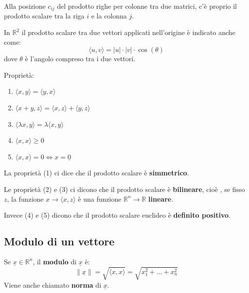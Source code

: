 \documentclass[
  a4paper,
]{article}
\providecommand{\tightlist}{%
  \setlength{\itemsep}{0pt}\setlength{\parskip}{0pt}}
\providecommand{\tightlist}{}
\begin{document}
\begin{observationbox}
Alla posizione \(c_{ij}\) del prodotto righe per colonne tra due
matrici, c'è proprio il prodotto scalare tra la riga \(i\) e la colonna
\(j\).
\end{observationbox}

\begin{observationbox}
In \(\mathbb{R}^2\) il prodotto scalare tra due vettori applicati
nell'origine è indicato anche come: \[
\langle u, v \rangle = |u|\cdot |v| \cdot \cos(\theta)
\] dove \(\theta\) è l'angolo compreso tra i due vettori.
\end{observationbox}

\begin{propositionbox}
Proprietà:

\begin{enumerate}
\def\labelenumi{\arabic{enumi}.}
\tightlist
\item
  \(\langle x, y \rangle = \langle y, x \rangle\)
\item
  \(\langle x + y, z \rangle =\langle x, z \rangle +\langle y, z \rangle\)
\item
  \(\langle \lambda x, y \rangle = \lambda \langle x, y \rangle\)
\item
  \(\langle x, x \rangle \ge 0\)
\item
  \(\langle x, x \rangle = 0 \iff x = \underline{0}\)
\end{enumerate}
\end{propositionbox}

\begin{observationbox}
La proprietà (1) ci dice che il prodotto scalare è \textbf{simmetrico}.

Le proprietà (2) e (3) ci dicono che il prodotto scalare è
\textbf{bilineare}, cioè , se fisso \(z\), la funzione
\(x \to \langle x, z \rangle\) è una funzione
\(\mathbb{R}^n \to \mathbb{R}\) \textbf{lineare}.

Invece (4) e (5) dicono che il prodotto scalare euclideo è
\textbf{definito positivo}.
\end{observationbox}

\hypertarget{modulo-di-un-vettore}{%
\subsection{Modulo di un vettore}\label{modulo-di-un-vettore}}

\begin{definitionbox}
Se \(\underline{x} \in \mathbb{R}^n\), il \textbf{modulo} di
\(\underline{x}\) è: \[
\lVert \underline{x} \rVert = \sqrt{\langle x, x \rangle} = \sqrt{x_1^2+ \dots+x_n^2}
\] Viene anche chiamato \textbf{norma} di \(\underline{x}\).
\end{definitionbox}
\end{document}
